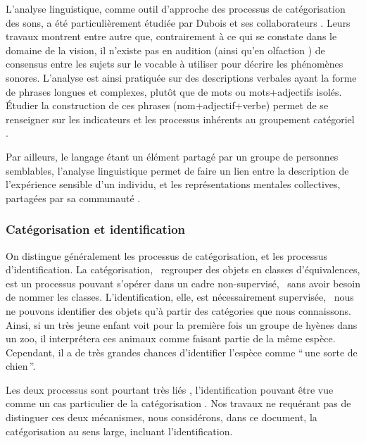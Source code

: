 L'analyse linguistique, comme outil d'approche des processus de catégorisation des sons, a été particulièrement étudiée par Dubois et ses collaborateurs \citep{dubois2000categories,raimbault2005urban,dubois2006cognitive,guastavino2006ideal}. Leurs travaux montrent entre autre que, contrairement à ce qui se constate dans le domaine de la vision, il n'existe pas en audition (ainsi qu'en olfaction \citep{dubois2000categories}) de consensus entre les sujets sur le vocable à utiliser pour décrire les phénomènes sonores. L'analyse est ainsi pratiquée sur des descriptions verbales ayant la forme de phrases longues et complexes, plutôt que de mots ou mots+adjectifs isolés. Étudier la construction de ces phrases (nom+adjectif+verbe) permet de se renseigner sur les indicateurs et les processus inhérents au groupement catégoriel \citep{dubois2000categories,guastavino2006ideal}.

Par ailleurs, le langage étant un élément partagé par un groupe de personnes semblables, l'analyse linguistique permet de faire un lien entre la description de l'expérience sensible d'un individu, et les représentations mentales collectives, partagées par sa communauté \citep{dubois2000categories}.

\subsubsection{Catégorisation et identification}

On distingue généralement les processus de catégorisation, et les processus d'identification.  La catégorisation, \ie~regrouper des objets en classes d'équivalences, est un processus pouvant s'opérer dans un cadre non-supervisé, \ie~sans avoir besoin de nommer les classes. L'identification, elle, est nécessairement supervisée, \ie~nous ne pouvons identifier des objets qu'à partir des catégories que nous connaissons. Ainsi, si un très jeune enfant voit pour la première fois un groupe de hyènes dans un zoo, il interprétera ces animaux comme faisant partie de la même espèce. Cependant, il a de très grandes chances d’identifier l'espèce comme ``\,une sorte de chien\,''.

Les deux processus sont pourtant très liés \citep{goldstone2003concepts}, l'identification pouvant être vue comme un cas particulier de la catégorisation \citep{schyns1998diagnostic}. Nos travaux ne requérant pas de distinguer ces deux mécanismes, nous considérons, dans ce document, la catégorisation au sens large, incluant l'identification.

